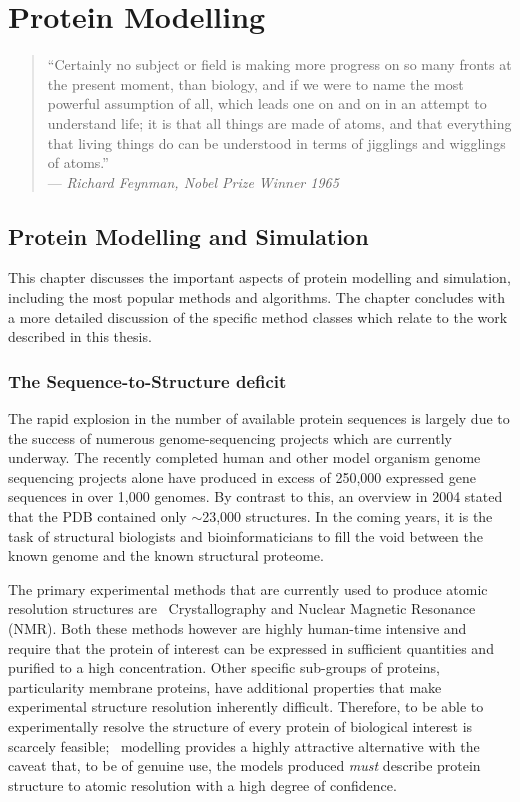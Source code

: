 \chapter{Protein Modelling}
\label{chapter:protein_modelling}

\begin{quote}
``Certainly no subject or field is making more progress on so many fronts at the present moment, than biology, and if we were to name the most powerful assumption of all, which leads one on and on in an attempt to understand life; it is that all things are made of atoms, and that everything that living things do can be understood in terms of jigglings and wigglings of atoms.'' \\
--- \textit{Richard Feynman, Nobel Prize Winner 1965}
\end{quote}

\section{Protein Modelling and Simulation}

This chapter discusses the important aspects of protein modelling and simulation, including the most popular methods and algorithms.
The chapter concludes with a more detailed discussion of the specific method classes which relate to the work described in this thesis.
\subsection{The Sequence-to-Structure deficit}

The rapid explosion in the number of available protein sequences is largely due to the success of  numerous genome-sequencing projects which are currently underway. The recently completed human  and other model organism genome sequencing projects alone have produced in excess of 250,000 expressed gene sequences in over 1,000 genomes. By contrast to this, an overview in 2004 stated that the PDB contained only $\sim$23,000 structures\cite{NATIVE:PDB:B}.
In the coming years, it is the task of structural biologists and bioinformaticians to fill the void between the known genome and the known structural proteome.


The primary experimental methods that are currently used to produce atomic resolution structures are \xray\ Crystallography and Nuclear Magnetic Resonance (NMR). Both these methods however are highly human-time intensive and require that the protein of interest can be expressed in sufficient quantities and purified to a high concentration. Other specific sub-groups of proteins, particularity membrane proteins, have additional properties that make experimental structure resolution inherently difficult. Therefore, to be able to experimentally resolve the structure of every protein of biological interest is scarcely feasible; \insilico\ modelling provides a highly attractive alternative with the caveat that, to be of genuine use, the models
produced \emph{must} describe protein structure to atomic resolution with a high degree of confidence.


